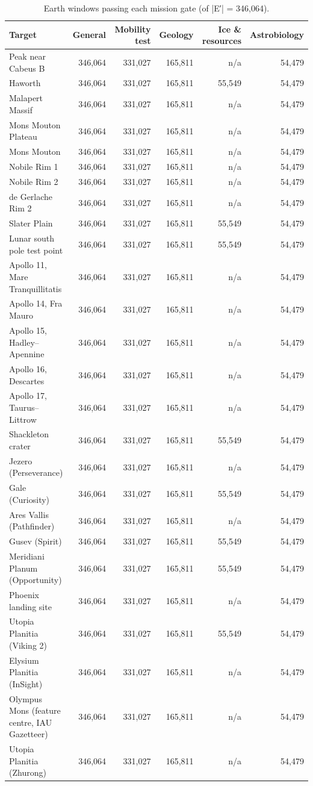 \begin{table}[ht]
\centering\small
\caption{Earth windows passing each mission gate (of |E′| = 346,064).}
\label{tab:gates}
\begin{tabular}{lrrrrr}
\hline
Target & General & Mobility test & Geology & Ice \& resources & Astrobiology \\
\hline
Peak near Cabeus B & 346,064 & 331,027 & 165,811 & n/a & 54,479 \\
Haworth & 346,064 & 331,027 & 165,811 & 55,549 & 54,479 \\
Malapert Massif & 346,064 & 331,027 & 165,811 & n/a & 54,479 \\
Mons Mouton Plateau & 346,064 & 331,027 & 165,811 & n/a & 54,479 \\
Mons Mouton & 346,064 & 331,027 & 165,811 & n/a & 54,479 \\
Nobile Rim 1 & 346,064 & 331,027 & 165,811 & n/a & 54,479 \\
Nobile Rim 2 & 346,064 & 331,027 & 165,811 & n/a & 54,479 \\
de Gerlache Rim 2 & 346,064 & 331,027 & 165,811 & n/a & 54,479 \\
Slater Plain & 346,064 & 331,027 & 165,811 & 55,549 & 54,479 \\
Lunar south pole test point & 346,064 & 331,027 & 165,811 & 55,549 & 54,479 \\
Apollo 11, Mare Tranquillitatis & 346,064 & 331,027 & 165,811 & n/a & 54,479 \\
Apollo 14, Fra Mauro & 346,064 & 331,027 & 165,811 & n/a & 54,479 \\
Apollo 15, Hadley–Apennine & 346,064 & 331,027 & 165,811 & n/a & 54,479 \\
Apollo 16, Descartes & 346,064 & 331,027 & 165,811 & n/a & 54,479 \\
Apollo 17, Taurus–Littrow & 346,064 & 331,027 & 165,811 & n/a & 54,479 \\
Shackleton crater & 346,064 & 331,027 & 165,811 & 55,549 & 54,479 \\
Jezero (Perseverance) & 346,064 & 331,027 & 165,811 & n/a & 54,479 \\
Gale (Curiosity) & 346,064 & 331,027 & 165,811 & 55,549 & 54,479 \\
Ares Vallis (Pathfinder) & 346,064 & 331,027 & 165,811 & n/a & 54,479 \\
Gusev (Spirit) & 346,064 & 331,027 & 165,811 & 55,549 & 54,479 \\
Meridiani Planum (Opportunity) & 346,064 & 331,027 & 165,811 & 55,549 & 54,479 \\
Phoenix landing site & 346,064 & 331,027 & 165,811 & n/a & 54,479 \\
Utopia Planitia (Viking 2) & 346,064 & 331,027 & 165,811 & 55,549 & 54,479 \\
Elysium Planitia (InSight) & 346,064 & 331,027 & 165,811 & n/a & 54,479 \\
Olympus Mons (feature centre, IAU Gazetteer) & 346,064 & 331,027 & 165,811 & n/a & 54,479 \\
Utopia Planitia (Zhurong) & 346,064 & 331,027 & 165,811 & n/a & 54,479 \\
\hline
\end{tabular}
\end{table}